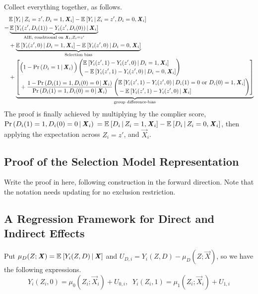 Collect everything together, as follows.
\begin{align*}
    &  \mathbb{E}_{} \left[ Y_i \, \middle\vert \, Z_i = z', D_i = 1, \boldsymbol{\mathit{X}}_i \right]
    - \mathbb{E}_{} \left[ Y_i \, \middle\vert \, Z_i = z', D_i = 0, \boldsymbol{\mathit{X}}_i \right] \\
    =& \underbrace{
        \mathbb{E}_{} \left[ Y_i(z', D_i(1)) - Y_i(z', D_i(0)) \, \middle\vert \, \boldsymbol{\mathit{X}}_i \right]}_{
            \text{AIE, conditional on }\boldsymbol{\mathit{X}}_i, Z_i = z'} \\
    &+ \underbrace{
        \mathbb{E}_{} \left[ Y_i(z', 0) \, \middle\vert \, D_i = 1, \boldsymbol{\mathit{X}}_i \right]
            - \mathbb{E}_{} \left[ Y_i(z', 0) \, \middle\vert \, D_i = 0, \boldsymbol{\mathit{X}}_i \right]}_{
                \text{Selection bias}} \\
    &+ \underbrace{\left[ \begin{aligned}
        &\Big(1 - \Pr\left( D_i = 1 \, \middle\vert \, \boldsymbol{\mathit{X}}_i \right) \Big)
        \left( \begin{aligned}
            &\mathbb{E}_{} \left[ Y_i(z', 1) - Y_i(z', 0) \, \middle\vert \, D_i = 1, \boldsymbol{\mathit{X}}_i \right] \\ 
            &  - \mathbb{E}_{} \left[ Y_i(z', 1) - Y_i(z', 0) \, \middle\vert \, D_i = 0, \boldsymbol{\mathit{X}}_i \right]
        \end{aligned} \right) \\
        &+ \frac{1 - \Pr\left( D_i(1) = 1, D_i(0) = 0 \, \middle\vert \, \boldsymbol{\mathit{X}}_i \right) }{
            \Pr\left( D_i(1) = 1, D_i(0) = 0 \, \middle\vert \, \boldsymbol{\mathit{X}}_i \right)} 
        \left( \begin{aligned}
            &\mathbb{E}_{} \left[ Y_i(z', 1) - Y_i(z', 0) \, \middle\vert \, D_i(1) = 0 \text{ or } D_i(0)=1, \boldsymbol{\mathit{X}}_i \right] \\ 
            &  - \mathbb{E}_{} \left[ Y_i(z', 1) - Y_i(z', 0) \, \middle\vert \, \boldsymbol{\mathit{X}}_i \right]
        \end{aligned} \right)
    \end{aligned} \right] }_{
        \text{group difference-bias}}
\end{align*}
The proof is finally achieved by multiplying by the complier score, 
$\Pr\left( D_i(1) = 1, D_i(0) = 0 \, \middle\vert \, \boldsymbol{\mathit{X}}_i \right)$
$= \mathbb{E}_{} \left[ D_i \, \middle\vert \, Z_i = 1, \boldsymbol{\mathit{X}}_i \right] - \mathbb{E}_{} \left[ D_i \, \middle\vert \, Z_i = 0, \boldsymbol{\mathit{X}}_i \right]$,
then applying the expectation across $Z_i = z'$, and $\vec X_i$.





\subsection{Proof of the Selection Model Representation}
\label{appendix:selection-model}
Write the proof in here, following \cite{vytlacil2002independence} construction in the forward direction.
Note that the notation needs updating for no exclusion restriction.

\subsection{A Regression Framework for Direct and Indirect Effects}
\label{appendix:regression-model}
Put $\mu_{D}(Z; \boldsymbol{\mathit{X}}) = \mathbb{E}_{} \left[ Y_i(Z, D) \, \middle\vert \, \boldsymbol{\mathit{X}} \right]$ and $U_{D, i} = Y_i(Z,D) - \mu_D(Z; \vec X)$, so we have the following expressions.
\[ Y_i(Z_i, 0)
        = \mu_{0}(Z_i; \vec X_i) + U_{0,i}, \;\;
    Y_i(Z_i, 1)
        = \mu_{1}(Z_i; \vec X_i) + U_{1,i} \]

